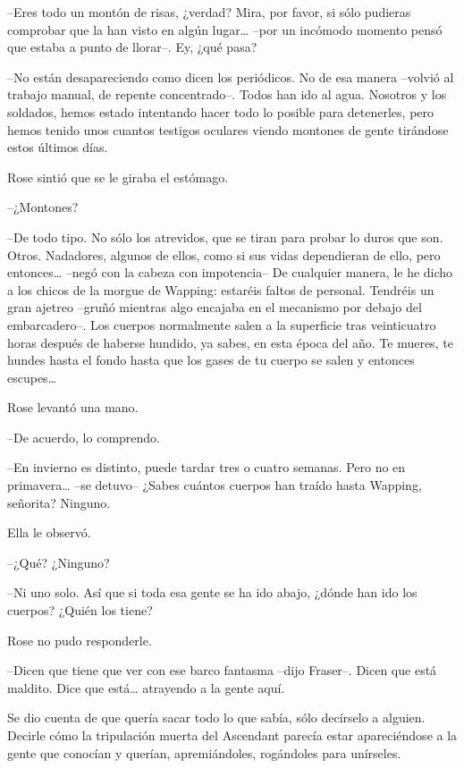{--Eres todo un montón de risas, ¿verdad? Mira, por favor, si sólo
 pudieras comprobar que la han visto en algún lugar\ldots{} --por un
incómodo momento pensó que estaba a punto de llorar--. Ey, ¿qué pasa?}

{--No están desapareciendo como dicen los periódicos. No de esa manera
 --volvió al trabajo manual, de repente concentrado--. Todos han ido al
 agua. Nosotros y los soldados, hemos estado intentando hacer todo lo
 posible para detenerles, pero hemos tenido unos cuantos testigos
oculares viendo montones de gente tirándose estos últimos días.}

{Rose sintió que se le giraba el estómago.}

{--¿Montones?}

{--De todo tipo. No sólo los atrevidos, que se tiran para probar lo
 duros que son. Otros. Nadadores, algunos de ellos, como si sus vidas
 dependieran de ello, pero entonces\ldots{} --negó con la cabeza con
 impotencia-- De cualquier manera, le he dicho a los chicos de la morgue
 de Wapping: estaréis faltos de personal. Tendréis un gran ajetreo
 --gruñó mientras algo encajaba en el mecanismo por debajo del
 embarcadero--. Los cuerpos normalmente salen a la superficie tras
 veinticuatro horas después de haberse hundido, ya sabes, en esta época
 del año. Te mueres, te hundes hasta el fondo hasta que los gases de tu
 cuerpo se salen y entonces escupes\ldots{}}

{Rose levantó una mano.}

{--De acuerdo, lo comprendo.}

{--En invierno es distinto, puede tardar tres o cuatro semanas. Pero no
 en primavera\ldots{} --se detuvo-- ¿Sabes cuántos cuerpos han traído
hasta Wapping, señorita? Ninguno.}

{Ella le observó.}

{--¿Qué? ¿Ninguno?}

{--Ni uno solo. Así que si toda esa gente se ha ido abajo, ¿dónde han
ido los cuerpos? ¿Quién los tiene?}

{Rose no pudo responderle.}

{--Dicen que tiene que ver con ese barco fantasma --dijo Fraser--. Dicen
 que está maldito. Dice que está\ldots{} atrayendo a la gente aquí.}

{Se dio cuenta de que quería sacar todo lo que sabía, sólo decírselo a
 alguien. Decirle cómo la tripulación muerta del Ascendant parecía estar
 apareciéndose a la gente que conocían y querían, apremiándoles,
rogándoles para unírseles.}

